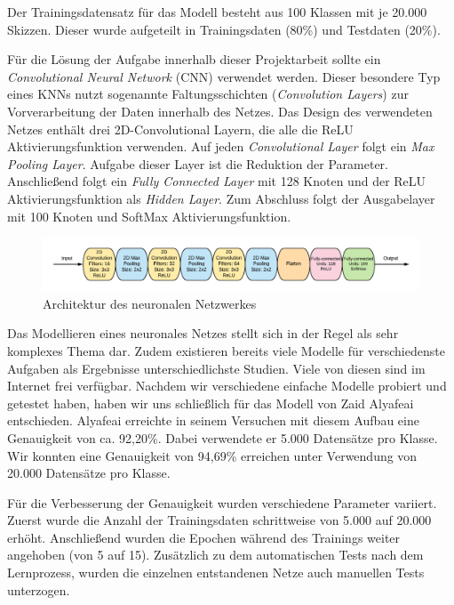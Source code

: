 \documentclass[11pt]{article}
\begin{document}
Der Trainingsdatensatz für das Modell besteht aus 100 Klassen mit je 20.000 Skizzen. Dieser wurde aufgeteilt in Trainingsdaten (80\%) und Testdaten (20\%).

Für die Lösung der Aufgabe innerhalb dieser Projektarbeit sollte  ein \textit{Convolutional Neural Network} (CNN) verwendet werden. Dieser besondere Typ eines KNNs nutzt sogenannte Faltungsschichten (\textit{Convolution Layers}) zur Vorverarbeitung der Daten innerhalb des Netzes.
Das Design des verwendeten Netzes enthält drei 2D-Convolutional Layern, die alle die ReLU Aktivierungsfunktion verwenden. Auf jeden \textit{Convolutional Layer} folgt ein \textit{Max Pooling Layer}. Aufgabe dieser Layer ist die Reduktion der Parameter. Anschließend folgt ein \textit{Fully Connected Layer} mit 128 Knoten und der ReLU Aktivierungsfunktion als \textit{Hidden Layer}. Zum Abschluss folgt der Ausgabelayer mit 100 Knoten und SoftMax Aktivierungsfunktion.

\begin{figure}[ht]
\centering
\includegraphics[width=1\textwidth]{images/Network Architecture1.png}
\caption{\label{fig:classDiagram}Architektur des neuronalen Netzwerkes}
\end{figure}

Das Modellieren eines neuronales Netzes stellt sich in der Regel als sehr komplexes Thema dar. Zudem existieren bereits viele Modelle für verschiedenste Aufgaben als Ergebnisse unterschiedlichste Studien. Viele von diesen sind im Internet frei verfügbar. Nachdem wir verschiedene einfache Modelle probiert und getestet haben, haben wir uns schließlich für das Modell von Zaid Alyafeai\parencite{ZaidAlyafeai2018} entschieden. Alyafeai erreichte in seinem Versuchen mit diesem Aufbau eine Genauigkeit von ca. 92,20\%. Dabei verwendete er 5.000 Datensätze pro Klasse. Wir konnten eine Genauigkeit von   94,69\% erreichen unter Verwendung von 20.000 Datensätze pro Klasse.

Für die Verbesserung der Genauigkeit wurden verschiedene Parameter variiert. Zuerst wurde die Anzahl der Trainingsdaten schrittweise von 5.000 auf 20.000 erhöht. Anschließend wurden die Epochen während des Trainings weiter angehoben (von 5 auf 15). 
Zusätzlich zu dem automatischen Tests nach dem Lernprozess, wurden die einzelnen entstandenen Netze auch manuellen Tests unterzogen.
\end{document}
